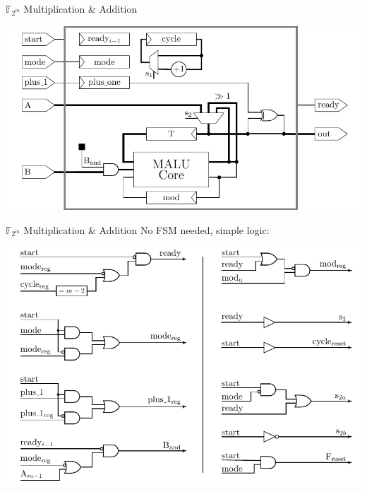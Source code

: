 \documentclass[svgnames, handout,t]{beamer}
\newenvironment{changemargin}[2]{%
\begin{list}{}{%
\setlength{\topsep}{0pt}%
\setlength{\leftmargin}{#1}%
\setlength{\rightmargin}{#2}%
\setlength{\listparindent}{\parindent}%
\setlength{\itemindent}{\parindent}%
\setlength{\parsep}{\parskip}%
}%
\item[]}{\end{list}}
\begin{document}
\begin{frame}{$\mathbb{F}_{2^m}$ Multiplication \& Addition}
	\begin{changemargin}{-4cm}{-4cm}
		\begin{center}\includegraphics[height=0.65\paperheight]{images/wrapper-gf2m}\end{center}
	\end{changemargin}
\end{frame}

\begin{frame}{$\mathbb{F}_{2^m}$ Multiplication \& Addition}
	No FSM needed, simple logic:\\[0.7em]
	\begin{changemargin}{-4cm}{-4cm}
		\begin{center}\includegraphics[height=0.55\paperheight]{images/wrapper-gf2m-logica}\end{center}
	\end{changemargin}
\end{frame}
\end{document}
